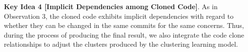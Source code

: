 {\bf Key Idea 4 [Implicit Dependencies among Cloned Code]}. As in
Observation 3, the cloned code exhibits implicit dependencies with
regard to whether they can be changed in the same commits for the same
concerns. Thus, during the process of producing the final
result, we also integrate the code clone relationships to
adjust the clusters produced by the clustering learning model.

